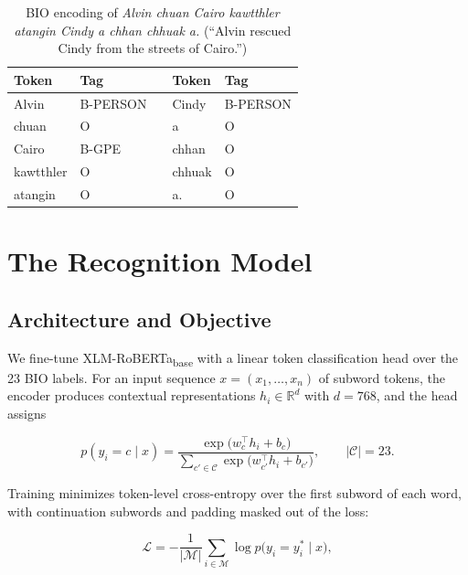 \documentclass[acmsmall,screen,review]{acmart}
\begin{document}
\begin{table}[htbp]
\centering
\caption{BIO encoding of \textit{Alvin chuan Cairo kawtthler atangin Cindy a
chhan chhuak a.} (``Alvin rescued Cindy from the streets of Cairo.'')}
\label{tab:bio_example}
\small
\begin{tabular}{llcll}
\hline
\textbf{Token} & \textbf{Tag} & \hspace{6mm} & \textbf{Token} & \textbf{Tag} \\
\hline
Alvin     & B-PERSON & & Cindy  & B-PERSON \\
chuan     & O        & & a      & O \\
Cairo     & B-GPE    & & chhan  & O \\
kawtthler & O        & & chhuak & O \\
atangin   & O        & & a.     & O \\
\hline
\end{tabular}
\end{table}

\section{The Recognition Model}
\label{sec:model}

\subsection{Architecture and Objective}
\label{sec:model:arch}

We fine-tune XLM-RoBERTa\textsubscript{base} \citep{conneau2020xlmr} with a
linear token classification head over the 23 BIO labels. For an input sequence
$x = (x_1, \ldots, x_n)$ of subword tokens, the encoder produces contextual
representations $h_i \in \mathbb{R}^{d}$ with $d = 768$, and the head assigns

\begin{equation}
\label{eq:softmax}
p(y_i = c \mid x) = \frac{\exp\bigl(w_c^{\top} h_i + b_c\bigr)}
                         {\sum_{c' \in \mathcal{C}} \exp\bigl(w_{c'}^{\top} h_i + b_{c'}\bigr)},
\qquad |\mathcal{C}| = 23 .
\end{equation}

Training minimizes token-level cross-entropy over the first subword of each
word, with continuation subwords and padding masked out of the loss:

\begin{equation}
\label{eq:loss}
\mathcal{L} = - \frac{1}{|\mathcal{M}|}
              \sum_{i \in \mathcal{M}} \log p\bigl(y_i = y_i^{\ast} \mid x\bigr),
\end{equation}
\end{document}
